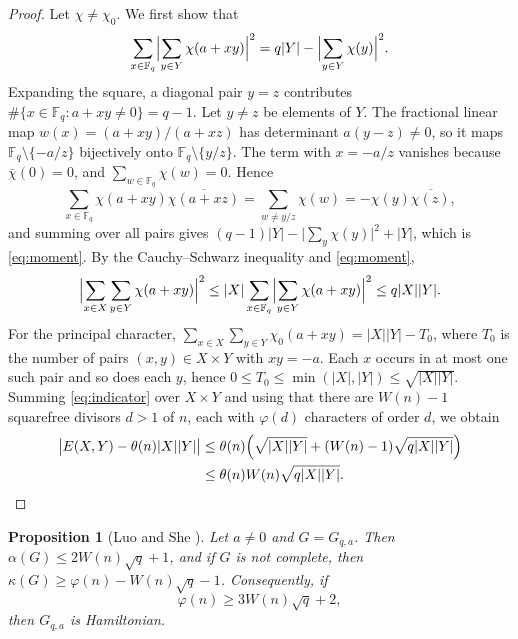 \documentclass{amsart}
\newtheorem{proposition}[theorem]{Proposition}
\theoremstyle{remark}
\numberwithin{equation}{section}
\numberwithin{table}{section}
\newcommand{\F}{\mathbb{F}}
\newcommand{\abs}[1]{\lvert #1\rvert}
\newcommand{\bigabs}[1]{\bigl\lvert #1\bigr\rvert}
\newcommand{\Bigabs}[1]{\Bigl\lvert #1\Bigr\rvert}
\begin{document}
\begin{proof}
Let $\chi\neq\chi_0$. We first show that
\begin{equation}\label{eq:moment}
\sum_{x\in\F_q}\Bigabs{\sum_{y\in Y}\chi(a+xy)}^{2}=q\abs Y-\Bigabs{\sum_{y\in Y}\chi(y)}^{2}.
\end{equation}
Expanding the square, a diagonal pair $y=z$ contributes $\#\{x\in\F_q: a+xy\neq0\}=q-1$. Let $y\neq z$ be elements of $Y$. The fractional linear map $w(x)=(a+xy)/(a+xz)$ has determinant $a(y-z)\neq0$, so it maps $\F_q\setminus\{-a/z\}$ bijectively onto $\F_q\setminus\{y/z\}$. The term with $x=-a/z$ vanishes because $\overline\chi(0)=0$, and $\sum_{w\in\F_q}\chi(w)=0$. Hence
\[
\sum_{x\in\F_q}\chi(a+xy)\overline{\chi(a+xz)}=\sum_{w\neq y/z}\chi(w)=-\chi(y)\overline{\chi(z)},
\]
and summing over all pairs gives $(q-1)\abs Y-\abs{\sum_{y}\chi(y)}^2+\abs Y$, which is \eqref{eq:moment}. By the Cauchy--Schwarz inequality and \eqref{eq:moment},
\[
\Bigabs{\sum_{x\in X}\sum_{y\in Y}\chi(a+xy)}^{2}\le \abs X\sum_{x\in\F_q}\Bigabs{\sum_{y\in Y}\chi(a+xy)}^{2}\le q\abs X\abs Y.
\]
For the principal character, $\sum_{x\in X}\sum_{y\in Y}\chi_0(a+xy)=\abs X\abs Y-T_0$, where $T_0$ is the number of pairs $(x,y)\in X\times Y$ with $xy=-a$. Each $x$ occurs in at most one such pair and so does each $y$, hence $0\le T_0\le\min(\abs X,\abs Y)\le\sqrt{\abs X\abs Y}$. Summing \eqref{eq:indicator} over $X\times Y$ and using that there are $W(n)-1$ squarefree divisors $d>1$ of $n$, each with $\varphi(d)$ characters of order $d$, we obtain
\begin{align*}
\bigabs{E(X,Y)-\theta(n)\abs X\abs Y}&\le\theta(n)\Bigl(\sqrt{\abs X\abs Y}+(W(n)-1)\sqrt{q\abs X\abs Y}\Bigr)\\
&\le\theta(n)W(n)\sqrt{q\abs X\abs Y}. \qedhere
\end{align*}
\end{proof}

\begin{proposition}[Luo and She {\cite[Lemmas~3.1, 3.2 and~(4)]{LS}}]\label{prop:criterion}
Let $a\neq0$ and $G=G_{q,a}$. Then $\alpha(G)\le 2W(n)\sqrt q+1$, and if $G$ is not complete, then $\kappa(G)\ge\varphi(n)-W(n)\sqrt q-1$. Consequently, if
\begin{equation}\label{eq:criterion}
\varphi(n)\ge 3W(n)\sqrt q+2,
\end{equation}
then $G_{q,a}$ is Hamiltonian.
\end{proposition}
\end{document}
